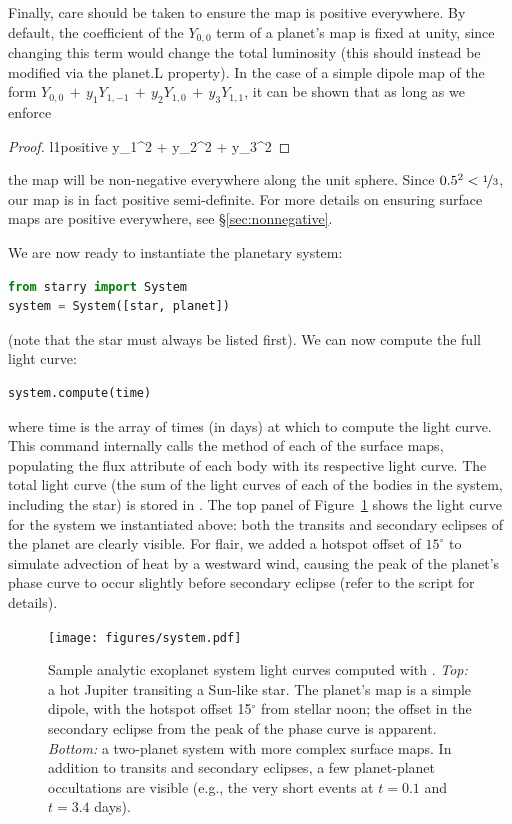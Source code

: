 \documentclass[modern]{aastex61}
\begin{document}
%
Finally, care should be taken to ensure the map is positive everywhere. By default,
the coefficient of the $Y_{0,0}$ term of a planet's map is fixed at unity, since
changing this term would change the total luminosity (this should instead be
modified via the \textsf{planet.L} property). In the case of a simple dipole map of
the form $Y_{0,0} \, + \, y_1 Y_{1, -1} \, + \, y_2 Y_{1, 0} \, + \, y_3 Y_{1, 1}$,
it can be shown that as long as we enforce
%
\begin{proof}{l1positive}
    \label{l1positive}
    y_1^2 + y_2^2 + y_3^2 \le {}
\end{proof}
%
the map will be non-negative everywhere along the unit sphere. Since $0.5^2 < \nicefrac{1}{3}$,
our map is in fact positive semi-definite.
%
For more details on ensuring surface maps are positive everywhere, see
\S\ref{sec:nonnegative}.

We are now ready to instantiate the planetary system:
%
\begin{lstlisting}[language=Python,firstnumber=last]
from starry import System
system = System([star, planet])
\end{lstlisting}
%
(note that the star must always be listed first).
We can now compute the full light curve:
%
\begin{lstlisting}[language=Python,firstnumber=last]
system.compute(time)
\end{lstlisting}
%
where \textsf{time} is the array of times (in days) at which to compute the
light curve. This command internally calls the \flux method of each
of the surface maps, populating the \textsf{flux} attribute of each body
with its respective light curve. The total light curve (the sum of the
light curves of each of the bodies in the system, including the star) is
stored in \starrySystemflux. The top panel of Figure~\ref{fig:system} shows
the light curve for the system we instantiated above: both the transits
and secondary eclipses of the planet are clearly visible. For flair, we added
a hotspot offset of $15^\circ$ to simulate advection of heat by a
westward wind, causing the peak of the planet's phase curve to occur slightly
before secondary eclipse (refer to the \Python script for details).

%
\begin{figure}[t!]
    \begin{centering}
    \texttt{[image: figures/system.pdf]}
    \caption{\label{fig:system}
             Sample analytic exoplanet system light curves computed with \starry.
             \emph{Top:} a hot Jupiter
             transiting a Sun-like star. The planet's map is a simple dipole,
             with the hotspot offset 15$^\circ$ from stellar noon; the offset
             in the secondary eclipse from the peak of the phase curve is
             apparent. \emph{Bottom:} a two-planet system with more complex
             surface maps. In addition to transits and secondary eclipses,
             a few planet-planet occultations are visible (e.g., the very short
             events at $t=0.1$ and $t=3.4$ days).
             }
    \end{centering}
\end{figure}
%
\end{document}
